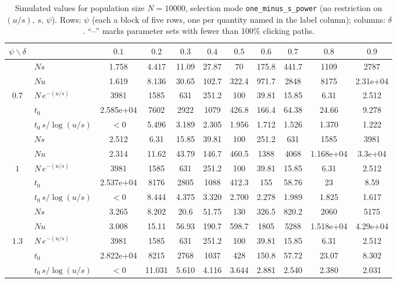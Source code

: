 \documentclass[10pt]{article}
\begin{document}
\begin{table}[t]
\centering
\caption{Simulated values for population size $N=10000$, selection mode
\texttt{one\_minus\_s\_power} (no restriction on $(u/s)$, $s$, $\psi$).
Rows: $\psi$ (each a block of five rows, one per quantity named in the label
column); columns: $\delta$. ``--'' marks parameter sets with fewer than
100\% clicking paths.}
\setlength{\tabcolsep}{4pt}
\begin{adjustbox}{max width=\textwidth, max totalheight=0.9\textheight, center}
\scriptsize
\begin{tabular}{c lccccccccc}
\toprule
$\psi \backslash \delta$ &  & $0.1$ & $0.2$ & $0.3$ & $0.4$ & $0.5$ & $0.6$ & $0.7$ & $0.8$ & $0.9$ \\
\midrule
 & $Ns$ & 1.758 & 4.417 & 11.09 & 27.87 & 70 & 175.8 & 441.7 & 1109 & 2787 \\
 & $Nu$ & 1.619 & 8.136 & 30.65 & 102.7 & 322.4 & 971.7 & 2848 & 8175 & 2.31e+04 \\
$0.7$ & $N\,e^{-(u/s)}$ & 3981 & 1585 & 631 & 251.2 & 100 & 39.81 & 15.85 & 6.31 & 2.512 \\
 & $t_0$ & 2.585e+04 & 7602 & 2922 & 1079 & 426.8 & 166.4 & 64.38 & 24.66 & 9.278 \\
 & $t_0\,s/\log(u/s)$ & $<0$ & 5.496 & 3.189 & 2.305 & 1.956 & 1.712 & 1.526 & 1.370 & 1.222 \\
\midrule
 & $Ns$ & 2.512 & 6.31 & 15.85 & 39.81 & 100 & 251.2 & 631 & 1585 & 3981 \\
 & $Nu$ & 2.314 & 11.62 & 43.79 & 146.7 & 460.5 & 1388 & 4068 & 1.168e+04 & 3.3e+04 \\
$1$ & $N\,e^{-(u/s)}$ & 3981 & 1585 & 631 & 251.2 & 100 & 39.81 & 15.85 & 6.31 & 2.512 \\
 & $t_0$ & 2.537e+04 & 8176 & 2805 & 1088 & 412.3 & 155 & 58.76 & 23 & 8.59 \\
 & $t_0\,s/\log(u/s)$ & $<0$ & 8.444 & 4.375 & 3.320 & 2.700 & 2.278 & 1.989 & 1.825 & 1.617 \\
\midrule
 & $Ns$ & 3.265 & 8.202 & 20.6 & 51.75 & 130 & 326.5 & 820.2 & 2060 & 5175 \\
 & $Nu$ & 3.008 & 15.11 & 56.93 & 190.7 & 598.7 & 1805 & 5288 & 1.518e+04 & 4.29e+04 \\
$1.3$ & $N\,e^{-(u/s)}$ & 3981 & 1585 & 631 & 251.2 & 100 & 39.81 & 15.85 & 6.31 & 2.512 \\
 & $t_0$ & 2.822e+04 & 8215 & 2768 & 1037 & 428 & 150.8 & 57.72 & 23.07 & 8.302 \\
 & $t_0\,s/\log(u/s)$ & $<0$ & 11.031 & 5.610 & 4.116 & 3.644 & 2.881 & 2.540 & 2.380 & 2.031 \\

\end{tabular}
\end{adjustbox}
\end{table}
\end{document}
